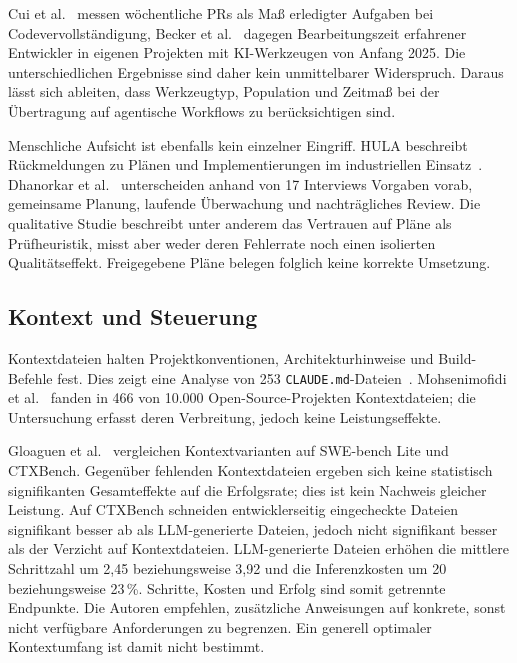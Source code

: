 \documentclass[conference]{IEEEtran}
\begin{document}
Cui et al.~\cite{cui2025genai} messen wöchentliche PRs als Maß erledigter Aufgaben bei Codevervollständigung, Becker et al.~\cite{becker2025metr} dagegen Bearbeitungszeit erfahrener Entwickler in eigenen Projekten mit KI-Werkzeugen von Anfang 2025. Die unterschiedlichen Ergebnisse sind daher kein unmittelbarer Widerspruch. Daraus lässt sich ableiten, dass Werkzeugtyp, Population und Zeitmaß bei der Übertragung auf agentische Workflows zu berücksichtigen sind.

Menschliche Aufsicht ist ebenfalls kein einzelner Eingriff. HULA beschreibt Rückmeldungen zu Plänen und Implementierungen im industriellen Einsatz~\cite{takerngsaksiri2025hula}. Dhanorkar et al.~\cite{dhanorkar2026oversight} unterscheiden anhand von 17 Interviews Vorgaben vorab, gemeinsame Planung, laufende Überwachung und nachträgliches Review. Die qualitative Studie beschreibt unter anderem das Vertrauen auf Pläne als Prüfheuristik, misst aber weder deren Fehlerrate noch einen isolierten Qualitätseffekt. Freigegebene Pläne belegen folglich keine korrekte Umsetzung.

\subsection{Kontext und Steuerung}
Kontextdateien halten Projektkonventionen, Architekturhinweise und Build-Befehle fest. Dies zeigt eine Analyse von 253 \texttt{CLAUDE.md}-Dateien~\cite{chatlatanagulchai2025manifests}. Mohsenimofidi et al.~\cite{mohsenimofidi2026context} fanden in 466 von 10.000 Open-Source-Projekten Kontextdateien; die Untersuchung erfasst deren Verbreitung, jedoch keine Leistungseffekte.

Gloaguen et al.~\cite{gloaguen2026agentsmd} vergleichen Kontextvarianten auf SWE-bench Lite und CTXBench. Gegenüber fehlenden Kontextdateien ergeben sich keine statistisch signifikanten Gesamteffekte auf die Erfolgsrate; dies ist kein Nachweis gleicher Leistung. Auf CTXBench schneiden entwicklerseitig eingecheckte Dateien signifikant besser ab als LLM-generierte Dateien, jedoch nicht signifikant besser als der Verzicht auf Kontextdateien. LLM-generierte Dateien erhöhen die mittlere Schrittzahl um 2,45 beziehungsweise 3,92 und die Inferenzkosten um 20 beziehungsweise 23\,\%. Schritte, Kosten und Erfolg sind somit getrennte Endpunkte. Die Autoren empfehlen, zusätzliche Anweisungen auf konkrete, sonst nicht verfügbare Anforderungen zu begrenzen. Ein generell optimaler Kontextumfang ist damit nicht bestimmt.
\end{document}
